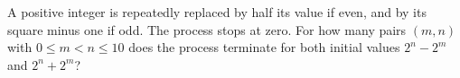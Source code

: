 A positive integer is repeatedly replaced by half its value if even, and by its square minus one if odd. The process stops at zero. For how many pairs $(m,n)$ with $0\le m<n\le10$ does the process terminate for both initial values $2^n-2^m$ and $2^n+2^m$?
